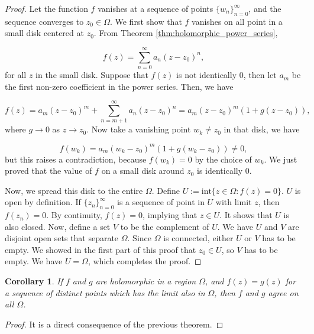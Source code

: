 \documentclass{article}
\newtheorem{corollary}{Corollary}
\begin{document}
\begin{proof}
Let the function $f$ vanishes at a sequence of points $\{w_n\}_{n=0}^\infty$, and the sequence converges to $z_0\in\Omega$. We first show that $f$ vanishes on all point in a small disk centered at $z_0$. From Theorem \ref{thm:holomorphic_power_series}, 

\begin{equation*}
f(z)=\sum_{n=0}^\infty a_n(z-z_0)^n,
\end{equation*}
for all $z$ in the small disk. Suppose that $f(z)$ is not identically $0$, then let $a_m$ be the first non-zero coefficient in the power series. Then, we have

\begin{equation*}
f(z)=a_m(z-z_0)^m+\sum_{n=m+1}^\infty a_n(z-z_0)^n=a_m(z-z_0)^m(1+g(z-z_0)),
\end{equation*}
where $g\rightarrow0$ as $z\rightarrow z_0$. Now take a vanishing point $w_k\neq z_0$ in that disk, we have 

\begin{equation*}
f(w_k)=a_m(w_k-z_0)^m(1+g(w_k-z_0))\neq0,
\end{equation*}
but this raises a contradiction, because $f(w_k)=0$ by the choice of $w_k$. We just proved that the value of $f$ on a small disk around $z_0$ is identically 0.

Now, we spread this disk to the entire $\Omega$. Define $U:=\text{int}\{z\in\Omega:f(z)=0\}$. $U$ is open by definition. If $\{z_n\}_{n=0}^\infty$ is a sequence of point in $U$ with limit $z$, then $f(z_n)=0$. By continuity, $f(z)=0$, implying that $z\in U$. It shows that $U$ is also closed. Now, define a set $V$ to be the complement of $U$. We have $U$ and $V$ are disjoint open sets that separate $\Omega$. Since $\Omega$ is connected, either $U$ or $V$ has to be empty. We showed in the first part of this proof that $z_0\in U$, so $V$ has to be empty. We have $U=\Omega$, which completes the proof. 

\end{proof}

\begin{corollary}
If $f$ and $g$ are holomorphic in a region $\Omega$, and $f(z)=g(z)$ for a sequence of distinct points which has the limit also in $\Omega$, then $f$ and $g$ agree on all $\Omega$.
\end{corollary}

\begin{proof}
It is a direct consequence of the previous theorem.
\end{proof}
\end{document}
